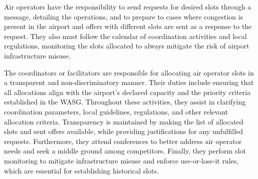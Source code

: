 %




Air operators have the responsibility to send requests for desired slots through
a message, detailing the operations, and to prepare to cases where congestion is
present in the airport and offers with different slots are sent as a response to
the request.
%
They also must follow the calendar of coordination activities and local
regulations, monitoring the slots allocated to always mitigate the risk of
airport infrastructure misuse.




The coordinators or facilitators are responsible for allocating air operator
slots in a transparent and non-discriminatory manner.
%
Their duties include ensuring that all allocations align with the airport's
declared capacity and the priority criteria established in the \acrshort{WASG}.
%
Throughout these activities, they assist in clarifying coordination parameters,
local guidelines, regulations, and other relevant allocation criteria.
%
Transparency is maintained by making the list of allocated slots and sent offers
available, while providing justifications for any unfulfilled requests.
%
Furthermore, they attend conferences to better address air operator needs and
seek a middle ground among competitors.
%
Finally, they perform slot monitoring to mitigate infrastructure misuse and
enforce use-or-lose-it rules, which are essential for establishing historical
slots.



